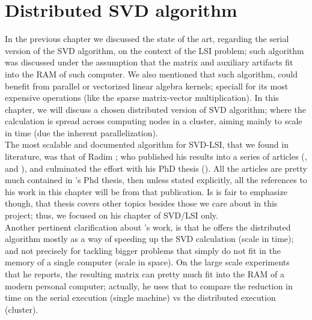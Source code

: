 \chapter{Distributed SVD algorithm}
\label{cha:svd-dist}

In the previous chapter we discussed the state of the art, regarding
the serial version of the SVD algorithm, on the context of the LSI
problem; such algorithm was discussed under the assumption that
the matrix and auxiliary artifacts fit into the RAM of such
computer. We also mentioned that such algorithm, could benefit from
parallel or vectorized linear algebra kernels; speciall for its most
expensive operations (like the sparse matrix-vector
multiplication). In this chapter, we will discuss a chosen distributed version
of SVD algorithm; where the calculation is spread across computing
nodes in a cluster, aiming mainly to scale in time (due the inherent
parallelization). \\

The most scalable and documented algorithm for SVD-LSI, that we found
in literature, was that of Radim \Rehurek; who published his results
into a series of articles (\cite{rehurek10a},
\cite{rehurek10b} and \cite{rehurek11b}), and culminated the effort
with his PhD thesis (\cite{rehurek11a}). All the articles are
  pretty much contained  in \Rehurek's Phd thesis, then unless stated
  explicitly, all the references to his work in this chapter will be
  from that publication. Is is 
fair to emphasize though, that \Rehurek thesis covers other topics
besides those we care about in this project; thus, we focused on his
chapter of SVD/LSI only. \\

Another pertinent clarification about \Rehurek's work, is that he
offers the distributed algorithm mostly as a way of speeding up the
SVD calculation (scale in time); and not precisely for tackling bigger
problems that simply do not fit in the memory of a single computer
(scale in space). On the large scale experiments that he reports, the
resulting matrix can pretty much fit into the RAM of a modern personal computer;
actually, he uses that to compare the reduction in time on the serial
execution (single machine) vs the distributed execution (cluster).








